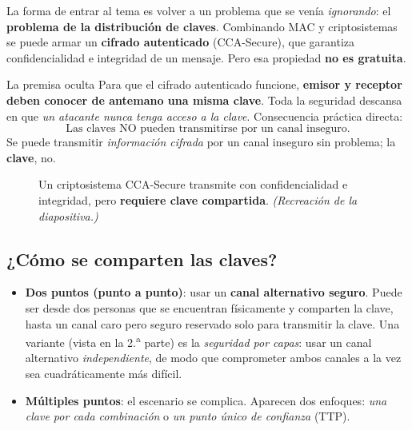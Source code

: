 \documentclass[11pt,a4paper]{article}
\newcommand{\Enc}{\mathrm{Enc}}
\begin{document}
La forma de entrar al tema es volver a un problema que se venía \emph{ignorando}: el
\textbf{problema de la distribución de claves}. Combinando MAC y criptosistemas se puede armar
un \textbf{cifrado autenticado} (CCA-Secure), que garantiza confidencialidad e integridad de
un mensaje. Pero esa propiedad \textbf{no es gratuita}.

\begin{defbox}{La premisa oculta}
Para que el cifrado autenticado funcione, \textbf{emisor y receptor deben conocer de antemano
una misma clave}. Toda la seguridad descansa en que \emph{un atacante nunca tenga acceso a la
clave}. Consecuencia práctica directa:
\[
\boxed{\text{Las claves NO pueden transmitirse por un canal inseguro.}}
\]
Se puede transmitir \emph{información cifrada} por un canal inseguro sin problema; la
\textbf{clave}, no.
\end{defbox}

\begin{figure}[h]
\centering
{}
\caption{Un criptosistema CCA-Secure transmite con confidencialidad e integridad, pero
\textbf{requiere clave compartida}. \textit{(Recreación de la diapositiva.)}}
\end{figure}

\subsection{¿Cómo se comparten las claves?}
\begin{itemize}[leftmargin=1.4em,itemsep=2pt]
  \item \textbf{Dos puntos (punto a punto)}: usar un \textbf{canal alternativo seguro}. Puede
        ser desde dos personas que se encuentran físicamente y comparten la clave, hasta un
        canal caro pero seguro reservado solo para transmitir la clave. Una variante (vista en
        la 2.\textsuperscript{a} parte) es la \emph{seguridad por capas}: usar un canal alternativo
        \emph{independiente}, de modo que comprometer ambos canales a la vez sea
        cuadráticamente más difícil.
  \item \textbf{Múltiples puntos}: el escenario se complica. Aparecen dos enfoques:
        \emph{una clave por cada combinación} o \emph{un punto único de confianza} (TTP).
\end{itemize}
\end{document}
